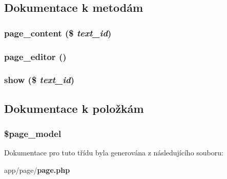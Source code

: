 \subsection{Dokumentace k metodám}
\subsubsection[{page\_\-content}]{\setlength{\rightskip}{0pt plus 5cm}page\_\-content (\$ {\em text\_\-id})}\label{d5/d13/classpage_a2142843179bb1715b50f356b5935ead8}
\subsubsection[{page\_\-editor}]{\setlength{\rightskip}{0pt plus 5cm}page\_\-editor ()}\label{d5/d13/classpage_a0a63fe507942528b7e28e347a8e412cf}
\subsubsection[{show}]{\setlength{\rightskip}{0pt plus 5cm}show (\$ {\em text\_\-id})}\label{d5/d13/classpage_aa96386f7747a22831b7f457a5de04492}


\subsection{Dokumentace k položkám}
\subsubsection[{\$page\_\-model}]{\setlength{\rightskip}{0pt plus 5cm}\${\bf page\_\-model}\hspace{0.3cm}{\ttfamily  [private]}}\label{d5/d13/classpage_ad44ec4ca5e6950115dfcdc9ea2afb9f6}


Dokumentace pro tuto třídu byla generována z následujícího souboru:\begin{DoxyCompactItemize}
\item 
app/page/{\bf page.php}\end{DoxyCompactItemize}
